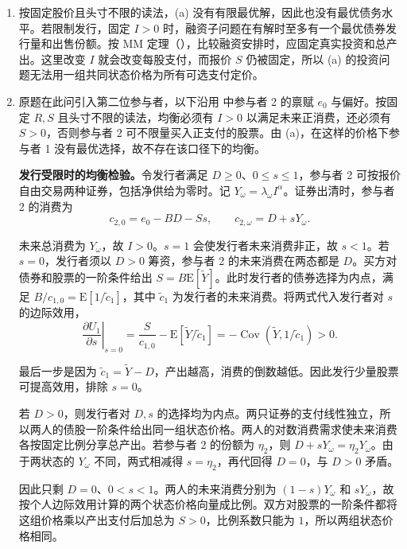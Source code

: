 \begin{solution}[blank-type=manual,blank-vsep=9\baselineskip]
\begin{enumerate}[label=(\alph*)]
固定 $I>0$ 时，消费是 $(D,s)$ 的仿射函数，对数效用使融资子问题严格凹。若加上发行限制，需先在每个 $I$ 下求融资子问题的最大值，再对 $I$ 求全局最大值，并检查发行限制绑定的解。上述方程只给出无约束一阶条件的候选。
\item 按固定股价且头寸不限的读法，(a) 没有有限最优解，因此也没有最优债务水平。若限制发行，固定 $I>0$ 时，融资子问题在有解时至多有一个最优债券发行量和出售份额。按 MM 定理\ifdefined\WJHandoutKnowledge（）\fi，比较融资安排时，应固定真实投资和总产出。这里改变 $I$ 就会改变每股支付，而报价 $S$ 仍被固定，所以 (a) 的投资问题无法用一组共同状态价格为所有可选支付定价。
\item 原题在此问引入第二位参与者，以下沿用 中参与者 2 的禀赋 $e_0$ 与偏好。按固定 $R,S$ 且头寸不限的读法，均衡必须有 $I>0$ 以满足未来正消费，还必须有 $S>0$，否则参与者 2 可不限量买入正支付的股票。由 (a)，在这样的价格下参与者 1 没有最优选择，故不存在该口径下的均衡。

\textbf{发行受限时的均衡检验。}令发行者满足 $D\ge0$、$0\le s\le1$，参与者 2 可按报价自由交易两种证券，包括净供给为零时。记 $Y_\omega=\lambda_\omega I^\alpha$。证券出清时，参与者 2 的消费为
\[
 c_{2,0}=e_0-BD-Ss,\qquad c_{2,\omega}=D+sY_\omega.
\]

未来总消费为 $Y_\omega$，故 $I>0$。$s=1$ 会使发行者未来消费非正，故 $s<1$。若 $s=0$，发行者须以 $D>0$ 筹资，参与者 2 的未来消费在两态都是 $D$。买方对债券和股票的一阶条件给出 $S=B\mathrm E[\widetilde Y]$。此时发行者的债券选择为内点，满足 $B/c_{1,0}=\mathrm E[1/\widetilde c_1]$，其中 $\widetilde c_1$ 为发行者的未来消费。将两式代入发行者对 $s$ 的边际效用，
\[
 \left.\frac{\partial U_1}{\partial s}\right|_{s=0}
 =\frac{S}{c_{1,0}}-\mathrm E[\widetilde Y/\widetilde c_1]
 =-\operatorname{Cov}(\widetilde Y,1/\widetilde c_1)>0.
\]

最后一步是因为 $\widetilde c_1=\widetilde Y-D$，产出越高，消费的倒数越低。因此发行少量股票可提高效用，排除 $s=0$。

若 $D>0$，则发行者对 $D,s$ 的选择均为内点。两只证券的支付线性独立，所以两人的债股一阶条件给出同一组状态价格。两人的对数消费需求使未来消费各按固定比例分享总产出。若参与者 2 的份额为 $\eta_2$，则 $D+sY_\omega=\eta_2Y_\omega$。由于两状态的 $Y_\omega$ 不同，两式相减得 $s=\eta_2$，再代回得 $D=0$，与 $D>0$ 矛盾。

因此只剩 $D=0$、$0<s<1$。两人的未来消费分别为 $(1-s)Y_\omega$ 和 $sY_\omega$，故按个人边际效用计算的两个状态价格向量成比例。双方对股票的一阶条件都将这组价格乘以产出支付后加总为 $S>0$，比例系数只能为 $1$，所以两组状态价格相同。


\end{enumerate}
\end{solution}
